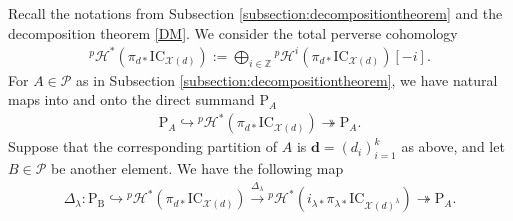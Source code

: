 \documentclass [11pt,oneside,a4paper,mathscr]{amsart}
\theoremstyle{definition}
\newcommand{\X}{\mathscr{X}}
\begin{document}

Recall the notations from Subsection \ref{subsection:decompositiontheorem} and the decomposition theorem \eqref{DM}.
We consider the total perverse cohomology 
\begin{align*}{}^p\mathcal{H}^{\ast}\left(\pi_{d*}\mathrm{IC}_{\X(d)}\right):=\bigoplus_{i\in\mathbb{Z}}{}^p\mathcal{H}^i\left(\pi_{d*}\mathrm{IC}_{\X(d)}\right)[-i].
\end{align*}
For $A\in\mathscr{P}$ as in Subsection \ref{subsection:decompositiontheorem}, 
we have natural maps into and onto the direct summand $\mathrm{P}_A$
\begin{align*}
\mathrm{P}_A\hookrightarrow {}^p\mathcal{H}^{\ast}\left(\pi_{d*}\mathrm{IC}_{\X(d)}\right) \twoheadrightarrow \mathrm{P}_A.
\end{align*}
Suppose that the corresponding partition of $A$ is $\mathbf{d}=(d_i)_{i=1}^k$
as above, and let
$B \in \mathscr{P}$ be another element. 
We have the following map 
\begin{align*}
    \Delta_{\lambda} \colon \mathrm{P}_{\mathrm{B}} \hookrightarrow 
    {}^p\mathcal{H}^{\ast}\left(\pi_{d*}\mathrm{IC}_{\X(d)}\right)
    \stackrel{\Delta_{\lambda}}{\to} {}^p\mathcal{H}^{\ast}\left(i_{\lambda*}\pi_{\lambda*}\mathrm{IC}_{\X(d)^{\lambda}}\right)
    \twoheadrightarrow \mathrm{P}_{A}. 
\end{align*}
\end{document}
